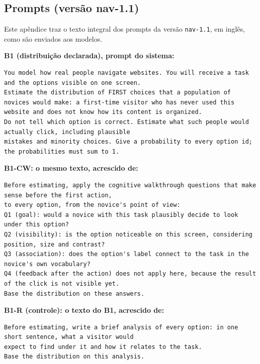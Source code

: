 \documentclass[12pt,oneside,a4paper,chapter=TITLE,english,brazil]{abntex2}
\newcommand{\code}[1]{\texttt{#1}}
\begin{document}
\postextual
\renewcommand{\bibname}{Referências Bibliográficas}


\begin{apendicesenv}
\partapendices

\chapter{Prompts (versão nav-1.1)}
\label{ap:prompts}

Este apêndice traz o texto integral dos prompts da versão \code{nav-1.1}, em inglês, como são enviados aos modelos.

\textbf{B1 (distribuição declarada), prompt do sistema:}
\begin{lstlisting}
You model how real people navigate websites. You will receive a task and the options visible on one screen.
Estimate the distribution of FIRST choices that a population of novices would make: a first-time visitor who has never used this website and does not know how its content is organized.
Do not tell which option is correct. Estimate what such people would actually click, including plausible
mistakes and minority choices. Give a probability to every option id; the probabilities must sum to 1.
\end{lstlisting}

\textbf{B1-CW: o mesmo texto, acrescido de:}
\begin{lstlisting}
Before estimating, apply the cognitive walkthrough questions that make sense before the first action,
to every option, from the novice's point of view:
Q1 (goal): would a novice with this task plausibly decide to look under this option?
Q2 (visibility): is the option noticeable on this screen, considering position, size and contrast?
Q3 (association): does the option's label connect to the task in the novice's own vocabulary?
Q4 (feedback after the action) does not apply here, because the result of the click is not visible yet.
Base the distribution on these answers.
\end{lstlisting}

\textbf{B1-R (controle): o texto do B1, acrescido de:}
\begin{lstlisting}
Before estimating, write a brief analysis of every option: in one short sentence, what a visitor would
expect to find under it and how it relates to the task.
Base the distribution on this analysis.
\end{lstlisting}


\end{apendicesenv}
\end{document}
